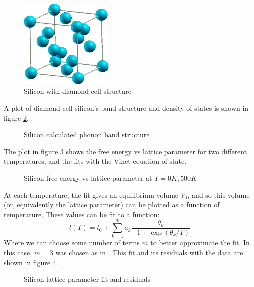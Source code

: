 \documentclass[12pt]{article}
\begin{document}
\begin{figure}
	\centering
	\includegraphics[width=0.4\textwidth]{figures/sidiamond.png}
	\caption{Silicon with diamond cell structure}
	\label{fig:siliconstructure}
\end{figure}
 A plot of diamond cell silicon's band structure and density of states is shown in figure \ref{fig:si_band_structure}.
\begin{figure}
	\centering
	
	\caption{Silicon calculated phonon band structure}
	\label{fig:si_band_structure}
\end{figure}

The plot in figure \ref{fig:si_two_temps} shows the free energy vs lattice parameter for two different temperatures, and the fits with the Vinet equation of state.

\begin{figure}
	\centering
	
	\caption{Silicon free energy vs lattice parameter at $T=0K,500K$}
	\label{fig:si_two_temps}
\end{figure}

At each temperature, the fit gives an equilibrium volume $V_0$, and so this volume (or, equivalently the lattice parameter) can be plotted as a function of temperature. These values can be fit to a function:
\begin{equation}\label{eq:lat_param}
	l(T) = l_0 + \sum_{k=1}^m a_k\frac{\theta_k}{-1+\exp(\theta_k/T)}
\end{equation}
Where we can choose some number of terms $m$ to better approximate the fit. In this case, $m=3$ was chosen as in \cite{middelmann2015thermal}. This fit and its residuals with the data are shown in figure \ref{fig:si_lat_param_temp}. 

\begin{figure}
	\centering
	\qquad
{}\qquad
	\caption{Silicon lattice parameter fit and residuals}
	\label{fig:si_lat_param_temp}
\end{figure}
\end{document}
